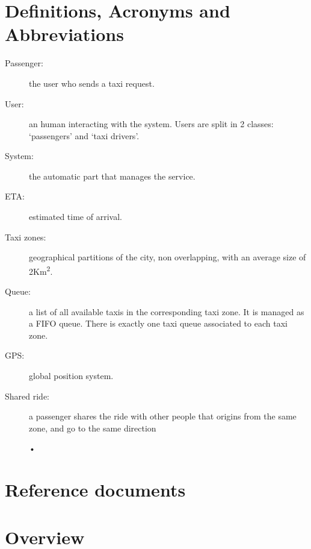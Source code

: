 \section{Definitions, Acronyms and Abbreviations}
\begin{description}
  \item[Passenger:] the user who sends a taxi request.
  \item[User:] an human interacting with the system. Users are split in 2 classes: `passengers' and `taxi drivers'.
  \item[System:] the automatic part that manages the service.
  \item[ETA:] estimated time of arrival.
  \item[Taxi zones:] geographical partitions of the city, non overlapping, with an average size of 2Km\textsuperscript{2}.
  \item[Queue:] a list of all available taxis in the corresponding taxi zone. It is managed as a FIFO queue.
    There is exactly one taxi queue associated to each taxi zone.
  \item[GPS:] global position system.
  \item[Shared ride:] a passenger shares the ride with other people that origins from the same zone, and go to the same direction
    \begin{center}
    •
    \end{center}
\end{description}


\section{Reference documents}


\section{Overview}

